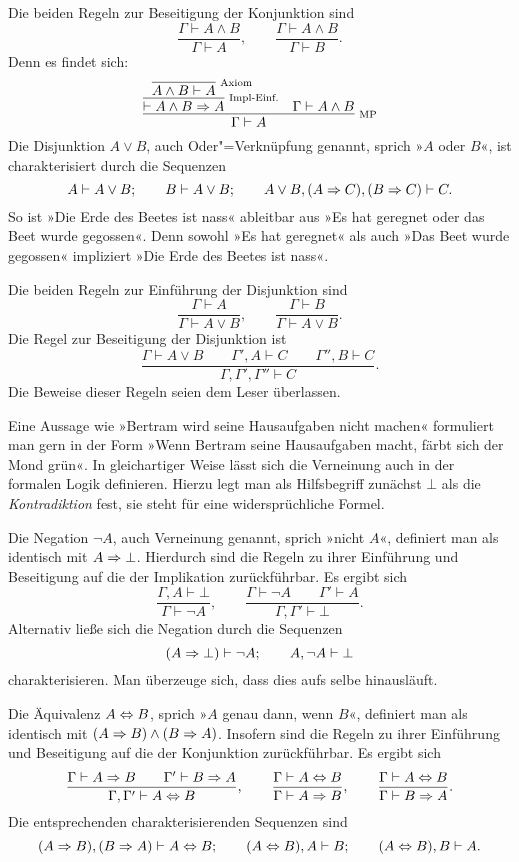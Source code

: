 Die beiden Regeln zur Beseitigung der Konjunktion sind
\[\dfrac{\Gamma\vdash A\land B}{\Gamma\vdash A},
\qquad\dfrac{\Gamma\vdash A\land B}{\Gamma\vdash B}.\]
Denn es findet sich:
\[
\infer[\infernote{MP}]{\Gamma\vdash A}{
  \infer[\infernote{Impl-Einf.}]{\vdash A\land B\cond A}{
    \infer[\infernote{Axiom}]{A\land B\vdash A}{}}
& \Gamma\vdash A\land B}
\]
Die Disjunktion $A\lor B$, auch Oder"=Verknüpfung
genannt, sprich »$A$ oder $B$«, ist charakterisiert durch die Sequenzen
\[A\vdash A\lor B;\qquad B\vdash A\lor B;\qquad
A\lor B, (A\Rightarrow C), (B\Rightarrow C)\vdash C.\]
So ist »Die Erde des Beetes ist nass« ableitbar aus »Es hat geregnet
oder das Beet wurde gegossen«. Denn sowohl »Es hat geregnet« als auch
»Das Beet wurde gegossen« impliziert »Die Erde des Beetes ist nass«.

Die beiden Regeln zur Einführung der Disjunktion sind
\[\dfrac{\Gamma\vdash A}{\Gamma\vdash A\lor B},\qquad
\dfrac{\Gamma\vdash B}{\Gamma\vdash A\lor B}.\]
Die Regel zur Beseitigung der Disjunktion ist
\[\dfrac{\Gamma\vdash A\lor B\qquad\Gamma',A\vdash C\qquad\Gamma'',B\vdash C}
{\Gamma,\Gamma',\Gamma''\vdash C}.\]
Die Beweise dieser Regeln seien dem Leser überlassen.

Eine Aussage wie »Bertram wird seine Hausaufgaben nicht machen«
formuliert man gern in der Form »Wenn Bertram seine Hausaufgaben macht,
färbt sich der Mond grün«. In gleichartiger Weise lässt sich die
Verneinung auch in der formalen Logik definieren. Hierzu legt man als
Hilfsbegriff zunächst $\bot$ als die \emph{Kontradiktion}%
 fest, sie steht für eine
widersprüchliche Formel.

Die Negation $\lnot A$, auch Verneinung genannt, sprich
»nicht $A$«, definiert man als identisch mit $A\Rightarrow\bot$. Hierdurch
sind die Regeln zu ihrer Einführung und Beseitigung auf die der
Implikation zurückführbar. Es ergibt sich
\[\dfrac{\Gamma,A\vdash\bot}{\Gamma\vdash\lnot A},
\qquad\dfrac{\Gamma\vdash\lnot A\qquad\Gamma'\vdash A}
{\Gamma,\Gamma'\vdash\bot}.\]
Alternativ ließe sich die Negation durch die Sequenzen
\[(A\Rightarrow\bot)\vdash\lnot A;\qquad A,\lnot A\vdash\bot\]
charakterisieren. Man überzeuge sich, dass dies aufs selbe hinausläuft.

Die Äquivalenz $A\Leftrightarrow B$, sprich
»$A$ genau dann, wenn $B$«, definiert man als identisch mit
$(A\Rightarrow B)\land (B\Rightarrow A)$. Insofern sind die Regeln zu ihrer
Einführung und Beseitigung auf die der Konjunktion zurückführbar.
Es ergibt sich
\[\dfrac{\Gamma\vdash A\Rightarrow B\qquad\Gamma'\vdash B\Rightarrow A}
{\Gamma,\Gamma'\vdash A\Leftrightarrow B},\qquad
\dfrac{\Gamma\vdash A\Leftrightarrow B}{\Gamma\vdash A\Rightarrow B},\qquad
\dfrac{\Gamma\vdash A\Leftrightarrow B}{\Gamma\vdash B\Rightarrow A}.\]
Die entsprechenden charakterisierenden Sequenzen sind
\[(A\Rightarrow B),(B\Rightarrow A)\vdash A\Leftrightarrow B;\qquad (A\Leftrightarrow B),A\vdash B;
\qquad (A\Leftrightarrow B),B\vdash A.\]

